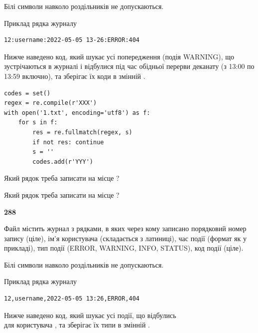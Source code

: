 Білі символи навколо роздільників не допускаються.

Приклад рядка журналу



\begin{verbatim}
12:username:2022-05-05 13-26:ERROR:404
\end{verbatim}


Нижче наведено код, який шукає усі попередження (подія WARNING), що зустрі\-ча\-ються в журналі і відбулися під час обідньої перерви деканату (з 13:00 по 13:59 включно), та зберігає їх коди в змінній .



\begin{verbatim}
codes = set()
regex = re.compile(r'XXX')
with open('1.txt', encoding='utf8') as f:
    for s in f:
        res = re.fullmatch(regex, s)
        if not res: continue
        s = ''
        codes.add(r'YYY')
\end{verbatim}







Який рядок треба записати на місце  ?\par
\vspace{5mm}


Який рядок треба записати на місце  ?\par


\newpage

{\begin {center}\textbf{ 288}\end {center}}\par
Файл  містить журнал з рядками, в яких через кому записано поряд\-ко\-вий номер запису (ціле), ім'я користувача (складається з латиниці), час події (фор\-мат як у прикладі), тип події (ERROR, WARNING, INFO, STATUS), код події (ціле).

Білі символи навколо роздільників не допускаються.

Приклад рядка журналу



\begin{verbatim}
12,username,2022-05-05 13:26,ERROR,404
\end{verbatim}


Нижче наведено код, який шукає усі події, що відбулись\\ для користувача , та зберігає їх типи в змінній .



